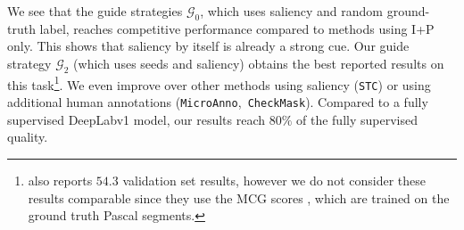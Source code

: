 \documentclass[british,10pt,twocolumn,letterpaper]{article}
\begin{document}
We see that the guide strategies $\mathcal{G}_{0}$, which uses saliency
and random ground-truth label, reaches competitive performance compared
to methods using $\text{I}$+P only. This shows that saliency by itself
is already a strong cue. Our guide strategy $\mathcal{G}_{2}$ (which
uses seeds and saliency) obtains the best reported results on this
task\footnote{\cite{Qi2016Eccv} also reports $54.3$ validation set results, however
we do not consider these results comparable since they use the MCG
scores \cite{PontTuset2015ArxivMcg}, which are trained on the ground
truth Pascal segments.}. We even improve over other methods using saliency (\texttt{STC})
or using additional human annotations (\texttt{MicroAnno},\texttt{
CheckMask}). Compared to a fully supervised DeepLabv1 model, our results
reach $80\%$ of the fully supervised quality. 
\end{document}
